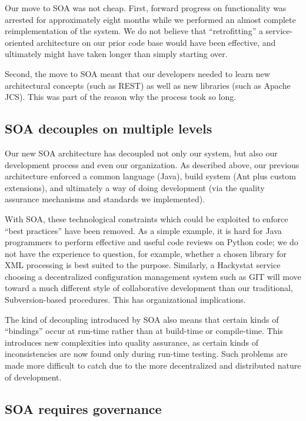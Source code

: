 \documentclass[conference,compsoc]{IEEEtran}
\begin{document}
Our move to SOA was not cheap.  First, forward progress on functionality was
arrested for approximately eight months while we performed an almost
complete reimplementation of the system.  We do not believe that
``retrofitting'' a service-oriented architecture on our prior code base
would have been effective, and ultimately might have taken longer than
simply starting over.  

Second, the move to SOA meant that our developers needed to learn new
architectural concepts (such as REST) as well as new libraries (such as
Apache JCS).  This was part of the reason why the process took so long.

\subsection{SOA decouples on multiple levels}

Our new SOA architecture has decoupled not only our system, but also our
development process and even our organization.  As described above, our
previous architecture enforced a common language (Java), build system (Ant
plus custom extensions), and ultimately a way of doing development (via the
quality assurance mechanisms and standards we implemented).

With SOA, these technological constraints which could be exploited to
enforce ``best practices'' have been removed.  As a simple example, it is
hard for Java programmers to perform effective and useful code reviews on
Python code; we do not have the experience to question, for example,
whether a chosen library for XML processing is best suited to the
purpose. Similarly, a Hackystat service choosing a decentralized
configuration management system such as GIT will move toward a much
different style of collaborative development than our traditional,
Subversion-based procedures.  This has organizational implications.

The kind of decoupling introduced by SOA also means that certain kinds of
``bindings'' occur at run-time rather than at build-time or compile-time.
This introduces new complexities into quality assurance, as certain kinds
of inconsistencies are now found only during run-time testing.  Such
problems are made more difficult to catch due to the more decentralized and
distributed nature of development.

\subsection{SOA requires governance}
\end{document}
